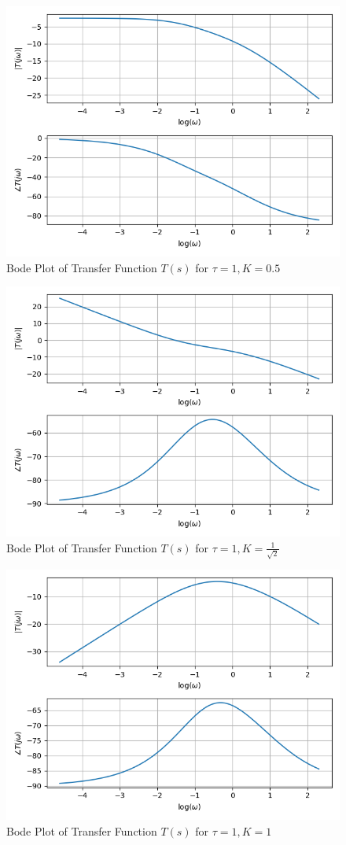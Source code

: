 \documentclass[journal,12pt,twocolumn]{IEEEtran}
\theoremstyle{remark}
\begin{document}
\begin{figure}[htbp]
	\includegraphics[width=\columnwidth]{figs/plot_lk.png}
	\caption{Bode Plot of Transfer Function $T(s)$ for $\tau=1,K=0.5$}
	\label{fig:bode_lk}
\end{figure}
\begin{figure}[htbp]
	\includegraphics[width=\columnwidth]{figs/plot_ek.png}
	\caption{Bode Plot of Transfer Function $T(s)$ for $\tau=1,K=\frac{1}{\sqrt{2}}$}
	\label{fig:bode_ek}
\end{figure}
\begin{figure}[htbp]
	\includegraphics[width=\columnwidth]{figs/plot_mk.png}
	\caption{Bode Plot of Transfer Function $T(s)$ for $\tau=1,K=1$}
	\label{fig:bode_mk}
\end{figure}
\end{document}
